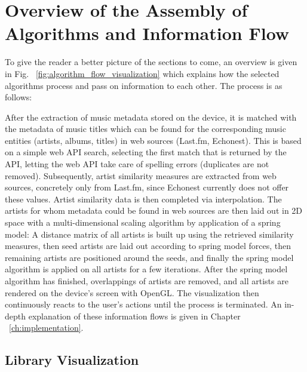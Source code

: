 \section{Overview of the Assembly of Algorithms and Information Flow}

To give the reader a better picture of the sections to come, an overview is given in Fig. ~\ref{fig:algorithm_flow_visualization} which explains how the selected algorithms process and pass on information to each other. The process is as follows:

\indent After the extraction of music metadata stored on the device, it is matched with the metadata of music titles which can be found for the corresponding music entities (artists, albums, titles) in web sources (Last.fm, Echonest). This is based on a simple web API search, selecting the first match that is returned by the API, letting the web API take care of spelling errors (duplicates are not removed). Subsequently, artist similarity measures are extracted from web sources, concretely only from Last.fm, since Echonest currently does not offer these values. Artist similarity data is then completed via interpolation. The artists for whom metadata could be found in web sources are then laid out in 2D space with a multi-dimensional scaling algorithm by application of a spring model: A distance matrix of all artists is built up using the retrieved similarity measures, then seed artists are laid out according to spring model forces, then remaining artists are positioned around the seeds, and finally the spring model algorithm is applied on all artists for a few iterations. After the spring model algorithm has finished, overlappings of artists are removed, and all artists are rendered on the device's screen with OpenGL. The visualization then continuously reacts to the user's actions until the process is terminated.
An in-depth explanation of these information flows is given in Chapter ~\ref{ch:implementation}.

\subsection{Library Visualization}

